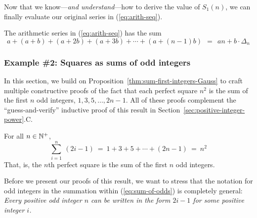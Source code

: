 \noindent {}
\medskip

Now that we know---{\em and understand}---how to derive the value of
$S_1(n)$, we can finally evaluate our original series in
(\ref{eq:arith-seq}).  

\begin{prop}
\label{thm:sum-of-arithmetic-series}
The arithmetic series in (\ref{eq:arith-seq}) has the sum
\begin{equation}
\label{eq:sum-arithmetic-series}
a + (a+b) + (a+2b) + (a+3b) + \cdots + (a+(n-1)b) \ \ = \ \
an + b \cdot \Delta_n
\end{equation}
\end{prop}


\subsubsection{Example \#2: Squares as sums of odd integers}
\label{sec:sumOfOdds}

In this section, we build on
Proposition~\ref{thm:sum-first-integers-Gauss} to craft multiple
constructive proofs of the fact that each perfect square $n^2$
is the sum of the first $n$ odd integers, $1, 3, 5, \ldots, 2n-1$.
All of these proofs complement the ``guess-and-verify'' inductive
proof of this result in Section~\ref{sec:positive-integer-power}.C.

\begin{prop}
\label{thm:squares-odd-integers-Gauss}
For all $n \in \mathbb{N}^+$,
\begin{equation}
\label{eq:sum-of-odds}
\sum_{i=1}^n \ (2i-1)
 \ = \ 1 + 3 + 5 + \cdots + (2n-1) \ = \ n^2
\end{equation}
That, is, the $n$th perfect square is the sum of the first $n$ odd
integers.
\end{prop}

Before we present our proofs of this result, we want to stress that the
notation for odd integers in the summation within (\ref{eq:sum-of-odds}) is completely
general: {\em Every positive odd integer $n$ can be written in the form
$2i-1$ for some positive integer $i$.}

